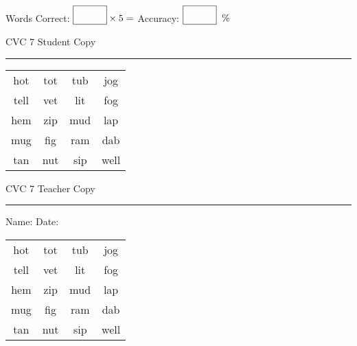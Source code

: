 \documentclass{memoir}
\begin{document}
\small

Words Correct: $\fbox{\phantom{\huge 100}} \times 5 = $ Accuracy: $\fbox{\phantom{\huge 100}}\;\; \%$ 

\vfill

\newpage


\footnotesize \noindent
CVC 7 \hfill Student Copy
\smallskip
\hrule

\Large

\setlength{\tabcolsep}{14pt}
\def\arraystretch{2}

{\selectfont


\begin{vplace}[0.5]
\begin{center}
\begin{tabular}{cccc}
hot & tot & tub & jog \\
tell & vet & lit & fog \\
hem & zip & mud & lap \\
mug & fig & ram & dab \\
tan & nut & sip & well \\
\end{tabular}
\end{center}
\end{vplace}

}

\newpage

\footnotesize \noindent
CVC 7 \hfill Teacher Copy
\smallskip
\hrule

\small

\vfill

\noindent
Name: \underline{\hspace{1.75in}} \hfill Date: \underline{\hspace{1in}}

\Large

{\selectfont


\begin{vplace}[0.5]
\begin{center}
\begin{tabular}{cccc}
hot & tot & tub & jog \\
tell & vet & lit & fog \\
hem & zip & mud & lap \\
mug & fig & ram & dab \\
tan & nut & sip & well \\
\end{tabular}
\end{center}
\end{vplace}



}
\end{document}
